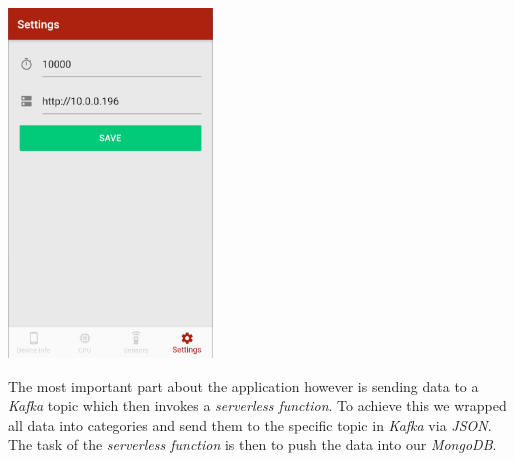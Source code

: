 \documentclass{article}
\begin{document}
\begin{itemize}
    \begin{center}
      \includegraphics[height=25em]{mobile-settings}
    \end{center}
  \end{itemize}

  The most important part about the application however is sending data to a \textit{Kafka} topic which then invokes a \textit{serverless function}. To achieve this we wrapped all data into categories and send them to the specific topic in \textit{Kafka} via \textit{JSON}. The task of the \textit{serverless function} is then to push the data into our \textit{MongoDB}.
  
\end{document}
